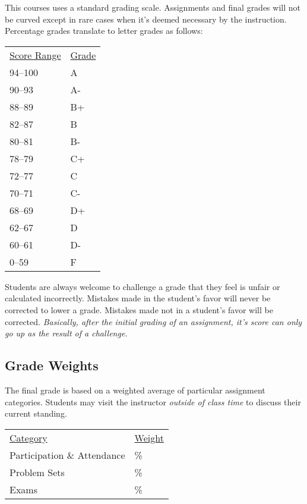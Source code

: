 \documentclass[nobib]{tufte-handout}
\begin{document}
This courses uses a standard grading scale.  Assignments and final grades will not be curved except in rare cases when it's deemed necessary by the instruction.  Percentage grades translate to letter grades as follows:
\newline
\begin{center}
\begin{small}
\begin{tabular}{ll}
\underline{Score Range} & \underline{Grade} \\
94--100 & A \\
90--93 & A- \\
88--89 & B+ \\
82--87 & B \\
80--81 & B- \\
78--79 & C+ \\
72--77 & C \\
70--71 & C- \\
68--69 & D+ \\
62--67 & D \\
60--61 & D- \\
0--59 & F
\end{tabular}
\end{small}
\end{center}


Students are always welcome to challenge a grade that they feel is unfair or calculated incorrectly.  Mistakes made in the student's favor will never be corrected to lower a grade.  Mistakes made not in a student's favor will be corrected.  \textit{Basically, after the initial grading of an assignment, it's score can only go up as the result of a challenge.}


\subsection{Grade Weights}

The final grade is based on a weighted average of particular assignment categories.  Students may visit the instructor \textit{outside of class time} to discuss their current standing.

\begin{center}
\begin{tabular}{ll}
\underline{Category} & \underline{Weight}  \\
Participation \& Attendance & \% \\
Problem Sets & \% \\
Exams & \% \\
\end{tabular}
\end{center}
\end{document}
